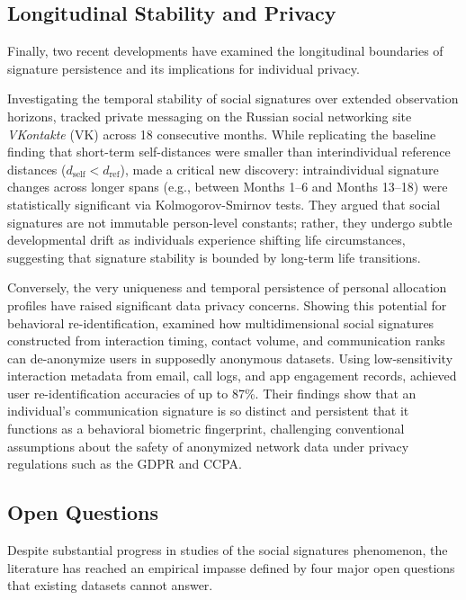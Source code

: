 \documentclass[11pt,letterpaper]{article}
\newcommand{\dself}{d_{\mathrm{self}}}
\newcommand{\dref}{d_{\mathrm{ref}}}
\begin{document}
\subsection{Longitudinal Stability and Privacy}

Finally, two recent developments have examined the longitudinal boundaries of signature persistence and its implications for individual privacy. 

Investigating the temporal stability of social signatures over extended observation horizons, \citet{koltsova2021social} tracked private messaging on the Russian social networking site \textit{VKontakte} (VK) across 18 consecutive months. While replicating the baseline finding that short-term self-distances were smaller than interindividual reference distances ($\dself < \dref$), \citet{koltsova2021social} made a critical new discovery: intraindividual signature changes across longer spans (e.g., between Months 1--6 and Months 13--18) were statistically significant via Kolmogorov-Smirnov tests. They argued that social signatures are not immutable person-level constants; rather, they undergo subtle developmental drift as individuals experience shifting life circumstances, suggesting that signature stability is bounded by long-term life transitions.

Conversely, the very uniqueness and temporal persistence of personal allocation profiles have raised significant data privacy concerns. Showing this potential for behavioral re-identification, \citet{jia2025multidimensional} examined how multidimensional social signatures constructed from interaction timing, contact volume, and communication ranks can de-anonymize users in supposedly anonymous datasets. Using low-sensitivity interaction metadata from email, call logs, and app engagement records, \citet{jia2025multidimensional} achieved user re-identification accuracies of up to 87\%. Their findings show that an individual's communication signature is so distinct and persistent that it functions as a behavioral biometric fingerprint, challenging conventional assumptions about the safety of anonymized network data under privacy regulations such as the GDPR and CCPA.

\subsection{Open Questions}

Despite substantial progress in studies of the social signatures phenomenon, the literature has reached an empirical impasse defined by four major open questions that existing datasets cannot answer.
\end{document}
